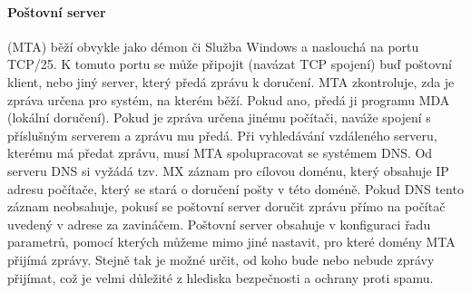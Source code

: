 \documentclass[10pt,a4paper]{article}
\begin{document}
\paragraph{Poštovní server} (MTA) běží obvykle jako démon či Služba Windows a naslouchá na portu TCP/25. K tomuto portu se může připojit (navázat TCP spojení) buď poštovní klient, nebo jiný server, který předá zprávu k doručení. MTA zkontroluje, zda je zpráva určena pro systém, na kterém běží. Pokud ano, předá ji programu MDA (lokální doručení). Pokud je zpráva určena jinému počítači, naváže spojení s příslušným serverem a zprávu mu předá. Při vyhledávání vzdáleného serveru, kterému má předat zprávu, musí MTA spolupracovat se systémem DNS. Od serveru DNS si vyžádá tzv. MX záznam pro cílovou doménu, který obsahuje IP adresu počítače, který se stará o doručení pošty v této doméně. Pokud DNS tento záznam neobsahuje, pokusí se poštovní server doručit zprávu přímo na počítač uvedený v adrese za zavináčem. Poštovní server obsahuje v konfiguraci řadu parametrů, pomocí kterých můžeme mimo jiné nastavit, pro které domény MTA přijímá zprávy. Stejně tak je možné určit, od koho bude nebo nebude zprávy přijímat, což je velmi důležité z hlediska bezpečnosti a ochrany proti spamu.
\end{document}
